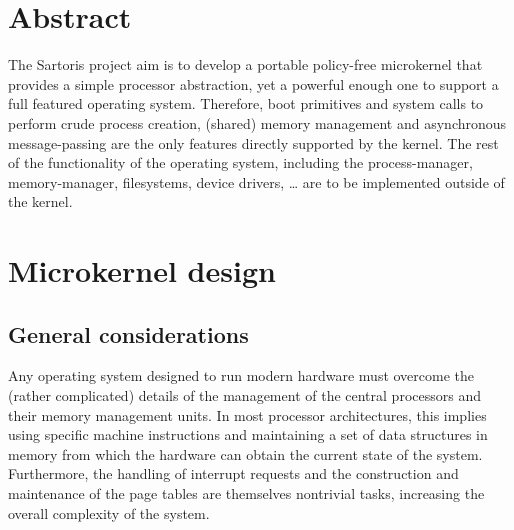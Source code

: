 \documentclass[11pt, letterpaper, twoside, english]{book}
\begin{document}
\frontmatter
\thispagestyle{empty}

\vspace*{2.5cm}
\noindent{}

\vspace{10cm}
\noindent{}

\newpage
\thispagestyle{empty}
\cleardoublepage

\chapter{Abstract}

The Sartoris project aim is to develop a portable policy-free microkernel that provides a simple processor abstraction, yet a powerful enough one to support a full featured operating system. Therefore, boot primitives and system calls to perform crude process creation, (shared) memory management and asynchronous message-passing are the only features directly supported by the kernel. The rest of the functionality of the operating system, including the process-manager, memory-manager, filesystems, device drivers, \ldots{} are to be implemented outside of the kernel.


\tableofcontents

\mainmatter

\chapter{Microkernel design}

\section{General considerations}
Any operating system designed to run modern hardware must overcome the (rather complicated) details of the management of the central processors and their memory management units. In most processor architectures, this implies using specific machine instructions and maintaining a set of data structures in memory from which the hardware can obtain the current state of the system. Furthermore, the handling of interrupt requests and the construction and maintenance of the page tables are themselves nontrivial tasks, increasing the overall complexity of the system.
\end{document}
